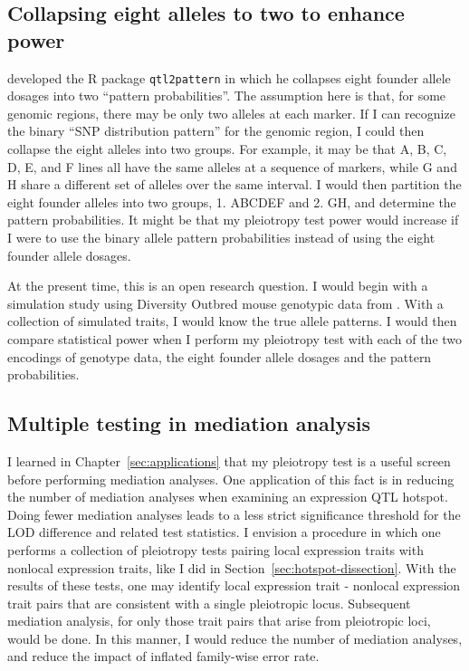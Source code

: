 \subsection{Collapsing eight alleles to two to enhance power}

\citet{qtl2pattern} developed the R package \texttt{qtl2pattern} in which he collapses eight founder allele dosages into two ``pattern probabilities''. The assumption here is that, for some genomic regions, there may be only two alleles at each marker. If I can recognize the binary ``SNP distribution pattern'' for the genomic region, I could then collapse the eight alleles into two groups. For example, it may be that A, B, C, D, E, and F lines all have the same alleles at a sequence of markers, while G and H share a different set of alleles over the same interval. I would then partition the eight founder alleles into two groups, 1. ABCDEF and 2. GH, and determine the pattern probabilities. It might be that my pleiotropy test power would increase if I were to use the binary allele pattern probabilities instead of using the eight founder allele dosages. 

At the present time, this is an open research question. I would begin with a simulation study using Diversity Outbred mouse genotypic data from \citep{keller2018genetic}. With a collection of simulated traits, I would know the true allele patterns. I would then compare statistical power when I perform my pleiotropy test with each of the two encodings of genotype data, the eight founder allele dosages and the pattern probabilities.








\subsection{Multiple testing in mediation analysis}

I learned in Chapter~\ref{sec:applications} that my pleiotropy test is a useful screen before performing mediation analyses. One application of this fact is in reducing the number of mediation analyses when examining an expression QTL hotspot. Doing fewer mediation analyses leads to a less strict significance threshold for the LOD difference and related test statistics. I envision a procedure in which one performs a collection of pleiotropy tests pairing local expression traits with nonlocal expression traits, like I did in Section~\ref{sec:hotspot-dissection}. With the results of these tests, one may identify local expression trait - nonlocal expression trait pairs that are consistent with a single pleiotropic locus. Subsequent mediation analysis, for only those trait pairs that arise from pleiotropic loci, would be done. In this manner, I would reduce the number of mediation analyses, and reduce the impact of inflated family-wise error rate.



